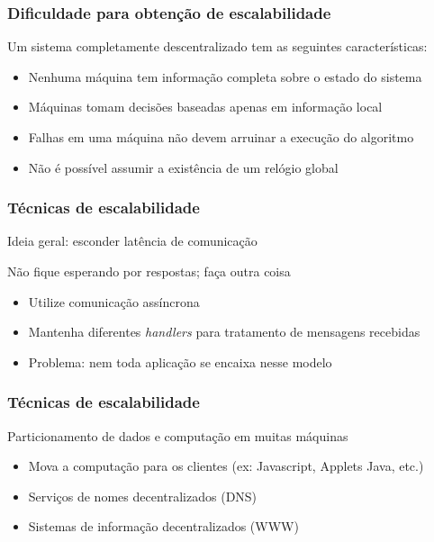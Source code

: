 \documentclass[Ligatures=TeX,table,brazil,svgnames,usetotalslideindicator,compress,10pt]{beamer}
\begin{document}
\begin{frame}
  \frametitle{Dificuldade para obtenção de escalabilidade}
  Um sistema completamente descentralizado tem as seguintes características:

  \begin{itemize}
  \item Nenhuma máquina tem informação completa sobre o estado do sistema
  \item Máquinas tomam decisões baseadas apenas em informação local
  \item Falhas em uma máquina não devem arruinar a execução do algoritmo
  \item Não é possível assumir a existência de um relógio global
  \end{itemize}
\end{frame}

\begin{frame}
  \frametitle{Técnicas de escalabilidade}

  Ideia geral: esconder latência de comunicação

  \begin{block}{Não fique esperando por respostas; faça outra coisa}
    \begin{itemize}
    \item Utilize \alert{comunicação assíncrona}
    \item Mantenha diferentes \textit{handlers} para tratamento de mensagens recebidas
    \item \alert{Problema:} nem toda aplicação se encaixa nesse modelo
    \end{itemize}
  \end{block}

\end{frame}

\begin{frame}
  \frametitle{Técnicas de escalabilidade}

  \begin{block}{Particionamento de dados e computação em muitas máquinas}
    \begin{itemize}
    \item Mova a computação para os clientes (ex: Javascript, Applets Java, etc.)
    \item Serviços de nomes decentralizados (DNS)
    \item Sistemas de informação decentralizados (WWW)
    \end{itemize}
  \end{block}

\end{frame}
\end{document}

